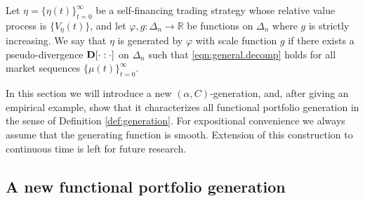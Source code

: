 \documentclass[graybox]{svmult}
\begin{document}
\begin{definition}  \label{def:generation}
Let $\eta = \{\eta(t)\}_{t = 0}^{\infty}$ be a self-financing trading strategy whose relative value process is $\{V_{\eta}(t)\}$, and let $\varphi, g: \Delta_n \rightarrow \mathbb{R}$ be functions on $\Delta_n$ where $g$ is strictly increasing. We say that  $\eta$ is generated by $\varphi$ with scale function $g$ if there exists a pseudo-divergence ${\bf D}[\cdot  : \cdot ]$ on $\Delta_n$ such that \eqref{eqn:general.decomp} holds for all market sequences $\{\mu(t)\}_{t = 0}^{\infty}$.
\end{definition}

In this section we will introduce a new $(\alpha, C)$-generation, and, after giving an empirical example, show that it characterizes all functional portfolio generation in the sense of Definition \ref{def:generation}. For expositional convenience we always assume that the generating function is smooth. Extension of this construction to continuous time is left for future research.

\subsection{A new functional portfolio generation}
\end{document}
